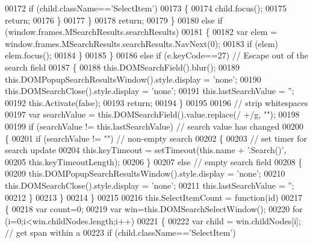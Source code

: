 \begin{DoxyCode}
00172           \textcolor{keywordflow}{if} (child.className==\textcolor{stringliteral}{'SelectItem'})
00173           \{
00174             child.focus();
00175             \textcolor{keywordflow}{return};
00176           \}
00177         \}
00178         \textcolor{keywordflow}{return};
00179       \}
00180       \textcolor{keywordflow}{else} \textcolor{keywordflow}{if} (window.frames.MSearchResults.searchResults)
00181       \{
00182         var elem = window.frames.MSearchResults.searchResults.NavNext(0);
00183         \textcolor{keywordflow}{if} (elem) elem.focus();
00184       \}
00185     \}
00186     \textcolor{keywordflow}{else} \textcolor{keywordflow}{if} (e.keyCode==27) \textcolor{comment}{// Escape out of the search field}
00187     \{
00188       this.DOMSearchField().blur();
00189       this.DOMPopupSearchResultsWindow().style.display = \textcolor{stringliteral}{'none'};
00190       this.DOMSearchClose().style.display = \textcolor{stringliteral}{'none'};
00191       this.lastSearchValue = \textcolor{stringliteral}{''};
00192       this.Activate(\textcolor{keyword}{false});
00193       \textcolor{keywordflow}{return};
00194     \}
00195 
00196     \textcolor{comment}{// strip whitespaces}
00197     var searchValue = this.DOMSearchField().value.replace(/ +/g, \textcolor{stringliteral}{""});
00198 
00199     \textcolor{keywordflow}{if} (searchValue != this.lastSearchValue) \textcolor{comment}{// search value has changed}
00200     \{
00201       \textcolor{keywordflow}{if} (searchValue != \textcolor{stringliteral}{""}) \textcolor{comment}{// non-empty search}
00202       \{
00203         \textcolor{comment}{// set timer for search update}
00204         this.keyTimeout = setTimeout(this.name + \textcolor{stringliteral}{'.Search()'},
00205                                      this.keyTimeoutLength);
00206       \}
00207       \textcolor{keywordflow}{else} \textcolor{comment}{// empty search field}
00208       \{
00209         this.DOMPopupSearchResultsWindow().style.display = \textcolor{stringliteral}{'none'};
00210         this.DOMSearchClose().style.display = \textcolor{stringliteral}{'none'};
00211         this.lastSearchValue = \textcolor{stringliteral}{''};
00212       \}
00213     \}
00214   \}
00215 
00216   this.SelectItemCount = \textcolor{keyword}{function}(id)
00217   \{
00218     var count=0;
00219     var win=this.DOMSearchSelectWindow();
00220     \textcolor{keywordflow}{for} (i=0;i<win.childNodes.length;i++)
00221     \{
00222       var child = win.childNodes[i]; \textcolor{comment}{// get span within a}
00223       \textcolor{keywordflow}{if} (child.className==\textcolor{stringliteral}{'SelectItem'})

\end{DoxyCode}
